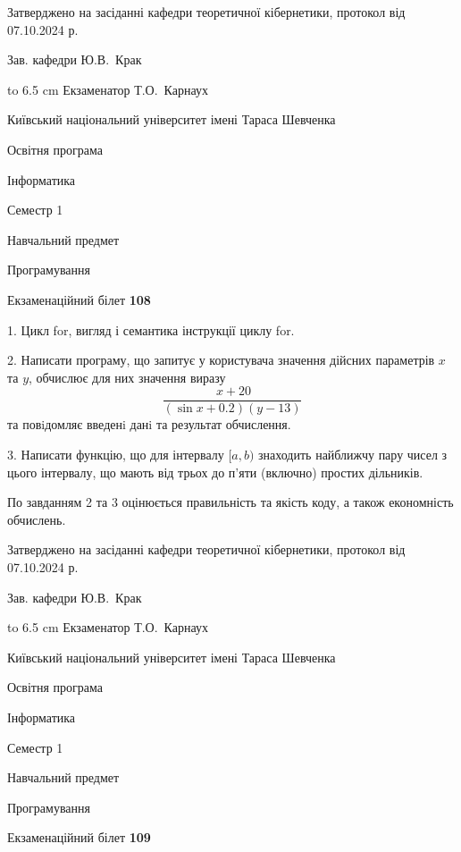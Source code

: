 \documentclass[12pt, ukrainian]{article}
\begin{document}
{\smallskip\smallskip \begin {scriptsize} Затверджено на засіданні кафедри теоретичної кібернетики, протокол   від   07.10.2024 р.\par\smallskip\smallskip\smallskip\smallskip
{\parbox {6.5 cm} {Зав. кафедри \dotfill Ю.В.~Крак}}\hspace {0.7cm} {\hbox to 6.5 cm { Екзаменатор \dotfill Т.О.~Карнаух}} \end{scriptsize}}
\vspace{0.9cm}
{{\begin {scriptsize}\par
{ \center  Київський національний університет імені Тараса Шевченка \par}
{\parbox {5 cm}{Освітня програма \hfill}{\parbox {7 cm}{Інформатика\hfill}}\parbox {6 cm}{\hfill Семестр 1}}\par
{\parbox {5 cm} {Навчальний предмет \hfill}\parbox {7 cm}{Програмування \hfill}\parbox {6cm}{\hfill}\par}\vspace{-15pt} \end{scriptsize}}{\center Екзаменаційний білет \No \textbf { 108 }\par}}
{%
1. Цикл for, вигляд і семантика інструкції циклу for.%
\par
2. Написати програму, що запитує у користувача значення дійсних параметрів $x$ та $y$, обчислює для них значення виразу 
$$\frac{\ x + 20}{(\sin x + 0.2) (y - 13)}$$ 
та повiдомляє введенi данi та результат обчислення.

\par
3. Написати функцію, що для інтервалу $[a, b)$ знаходить найближчу пару чисел з цього інтервалу, що мають від трьох до п'яти (включно) простих дільників.

По завданням 2 та 3 оцінюється правильність та якість коду, а також економність обчислень.

}
{\smallskip\smallskip \begin {scriptsize} Затверджено на засіданні кафедри теоретичної кібернетики, протокол   від   07.10.2024 р.\par\smallskip\smallskip\smallskip\smallskip
{\parbox {6.5 cm} {Зав. кафедри \dotfill Ю.В.~Крак}}\hspace {0.7cm} {\hbox to 6.5 cm { Екзаменатор \dotfill Т.О.~Карнаух}} \end{scriptsize}}
\newpage
{{\begin {scriptsize}\par
{ \center  Київський національний університет імені Тараса Шевченка \par}
{\parbox {5 cm}{Освітня програма \hfill}{\parbox {7 cm}{Інформатика\hfill}}\parbox {6 cm}{\hfill Семестр 1}}\par
{\parbox {5 cm} {Навчальний предмет \hfill}\parbox {7 cm}{Програмування \hfill}\parbox {6cm}{\hfill}\par}\vspace{-15pt} \end{scriptsize}}{\center Екзаменаційний білет \No \textbf { 109 }\par}}
\end{document}
